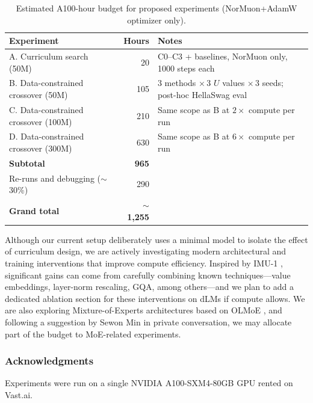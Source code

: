 \documentclass{article}
\begin{document}
\begin{table}[h]
\centering
\caption{Estimated A100-hour budget for proposed experiments
(NorMuon+AdamW optimizer only).}
\label{tab:budget}
\vspace{2pt}
\small
\begin{tabular}{lrl}
\toprule
Experiment & Hours & Notes \\
\midrule
A. Curriculum search (50M) & 20 &
  C0--C3 + baselines, NorMuon only, 1000 steps each \\
B. Data-constrained crossover (50M) & 105 &
  3 methods $\times$\,3 $U$ values $\times$\,3 seeds; post-hoc HellaSwag eval \\
C. Data-constrained crossover (100M) & 210 &
  Same scope as B at $2\times$ compute per run \\
D. Data-constrained crossover (300M) & 630 &
  Same scope as B at $6\times$ compute per run \\
\midrule
\textbf{Subtotal} & \textbf{965} & \\
Re-runs and debugging ($\sim$30\%) & 290 & \\
\midrule
\textbf{Grand total} & \textbf{$\sim$1{,}255} & \\
\bottomrule
\end{tabular}
\vspace{-8pt}
\end{table}

Although our current setup deliberately uses a minimal model to isolate
the effect of curriculum design, we are actively investigating modern
architectural and training interventions that improve compute efficiency.
Inspired by IMU-1 \citep{imu1_2025}, significant gains can come from
carefully combining known techniques---value embeddings, layer-norm
rescaling, GQA, among others---and we plan to add a dedicated ablation
section for these interventions on dLMs if compute allows.
We are also exploring Mixture-of-Experts architectures based on
OLMoE \citep{olmoe2025}, and following a suggestion by Sewon Min in private
conversation, we may allocate part of the budget to MoE-related experiments.

\subsubsection*{Acknowledgments}
Experiments were run on a single NVIDIA A100-SXM4-80GB GPU rented on Vast.ai.



\end{document}

